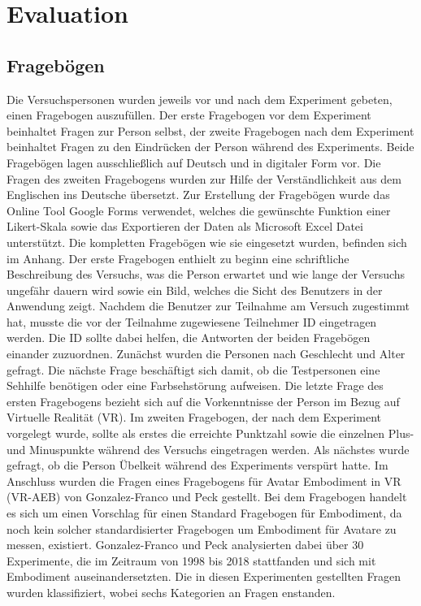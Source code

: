 \chapter{Evaluation}

\section{Fragebögen}
Die Versuchspersonen wurden jeweils vor und nach dem Experiment gebeten, einen Fragebogen auszufüllen. Der erste Fragebogen vor dem Experiment beinhaltet Fragen zur Person selbst, der zweite Fragebogen nach dem Experiment beinhaltet Fragen zu den Eindrücken der Person während des Experiments. Beide Fragebögen lagen ausschließlich auf Deutsch und in digitaler Form vor. Die Fragen des zweiten Fragebogens wurden zur Hilfe der Verständlichkeit aus dem Englischen ins Deutsche übersetzt. Zur Erstellung der Fragebögen wurde das Online Tool Google Forms verwendet, welches die gewünschte Funktion einer Likert-Skala sowie das Exportieren der Daten als Microsoft Excel Datei unterstützt. Die kompletten Fragebögen wie sie eingesetzt wurden, befinden sich im Anhang.
Der erste Fragebogen enthielt zu beginn eine schriftliche Beschreibung des Versuchs, was die Person erwartet und wie lange der Versuchs ungefähr dauern wird sowie ein Bild, welches die Sicht des Benutzers in der Anwendung zeigt. Nachdem die Benutzer zur Teilnahme am Versuch zugestimmt hat, musste die vor der Teilnahme zugewiesene Teilnehmer ID eingetragen werden. Die ID sollte dabei helfen, die Antworten der beiden Fragebögen einander zuzuordnen. Zunächst wurden die Personen nach Geschlecht und Alter gefragt. Die nächste Frage beschäftigt sich damit, ob die Testpersonen eine Sehhilfe benötigen oder eine Farbsehstörung aufweisen. Die letzte Frage des ersten Fragebogens bezieht sich auf die Vorkenntnisse der Person im Bezug auf Virtuelle Realität (VR). 
Im zweiten Fragebogen, der nach dem Experiment vorgelegt wurde, sollte als erstes die erreichte Punktzahl sowie die einzelnen Plus- und Minuspunkte während des Versuchs eingetragen werden. Als nächstes wurde gefragt, ob die Person Übelkeit während des Experiments verspürt hatte.
Im Anschluss wurden die Fragen eines Fragebogens für Avatar Embodiment in VR (VR-AEB) von Gonzalez-Franco und Peck \cite{Gonzalez-Franco2018} gestellt. Bei dem Fragebogen handelt es sich um einen Vorschlag für einen Standard Fragebogen für Embodiment, da noch kein solcher standardisierter Fragebogen um Embodiment für Avatare zu messen, existiert. Gonzalez-Franco und Peck analysierten dabei über 30 Experimente, die im Zeitraum von 1998 bis 2018 stattfanden und sich mit Embodiment auseinandersetzten. Die in diesen Experimenten gestellten Fragen wurden klassifiziert, wobei sechs Kategorien an Fragen enstanden.
